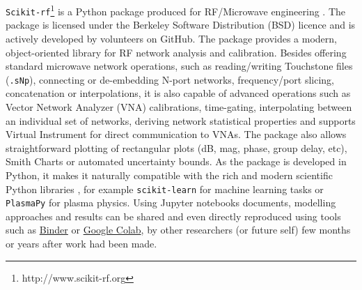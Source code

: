 \texttt{Scikit-rf}\footnote{http://www.scikit-rf.org} is a Python package produced for RF/Microwave engineering  \cite{arsenovic2018}. The package is licensed under the Berkeley Software Distribution (BSD) licence and is actively developed by volunteers on GitHub. The package provides a modern, object-oriented library for RF network analysis and calibration. Besides offering standard microwave network operations, such as reading/writing Touchstone files (\texttt{.sNp}), connecting or de-embedding N-port networks, frequency/port slicing, concatenation or interpolations, it is also capable of advanced operations such as Vector Network Analyzer (VNA) calibrations, time-gating, interpolating between an individual set of networks, deriving network statistical properties and supports Virtual Instrument for direct communication to VNAs. The package also allows straightforward plotting of rectangular plots (dB, mag, phase, group delay, etc), Smith Charts or automated uncertainty bounds. As the package is developed in Python, it makes it naturally compatible with the rich and modern scientific Python libraries \cite{millman2011}, for example  \texttt{scikit-learn} for machine learning tasks \cite{pedregosa2011} or \texttt{PlasmaPy} \cite{plasmapycommunity2019} for plasma physics. Using Jupyter notebooks documents\cite{kluyver2016}, modelling approaches and results can be shared and even directly reproduced using tools such as \href{https://mybinder.org/}{Binder} or \href{https://colab.research.google.com/}{Google Colab}, by other researchers (or future self) few months or years after work had been made.